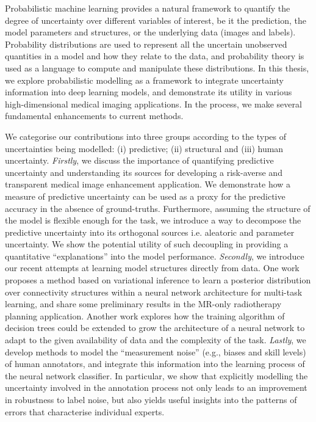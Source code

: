 \documentclass[12pt,a4paper,twoside]{book}
\begin{document}
Probabilistic machine learning provides a natural framework to quantify the degree of uncertainty over different variables of interest, be it the prediction, the model parameters and structures, or the underlying data (images and labels). Probability distributions are used to represent all the uncertain unobserved quantities in a model and how they relate to the data, and probability theory is used as a language to compute and manipulate these distributions. In this thesis, we explore probabilistic modelling as a framework to integrate uncertainty information into deep learning models, and demonstrate its utility in various high-dimensional medical imaging applications. In the process, we make several fundamental enhancements to current methods. 

We categorise our contributions into three groups according to the types of uncertainties being modelled: (i) predictive; (ii) structural and (iii) human uncertainty. \textit{Firstly}, we discuss the importance of quantifying predictive uncertainty and understanding its sources for developing a risk-averse and transparent medical image enhancement application. We demonstrate how a measure of predictive uncertainty can be used as a proxy for the predictive accuracy in the absence of ground-truths. Furthermore, assuming the structure of the model is flexible enough for the task, we introduce a way to decompose the predictive uncertainty into its orthogonal sources i.e. aleatoric and parameter uncertainty. We show the potential utility of such decoupling in providing a quantitative ``explanations'' into the model performance. \textit{Secondly}, we introduce our recent attempts at learning model structures directly from data. One work proposes a method based on variational inference to learn a posterior distribution over connectivity structures within a neural network architecture for multi-task learning, and share some preliminary results in the MR-only radiotherapy planning application. Another work explores how the training algorithm of decision trees could be extended to grow the architecture of a neural network to adapt to the given availability of data and the complexity of the task.  \textit{Lastly},  we develop methods to model the ``measurement noise'' (e.g., biases and skill levels) of human annotators, and integrate this information into the learning process of the neural network classifier. In particular, we show that explicitly modelling the uncertainty involved in the annotation process not only leads to an improvement in robustness to label noise, but also yields useful insights into the patterns of errors that characterise individual experts. 
\end{document}
